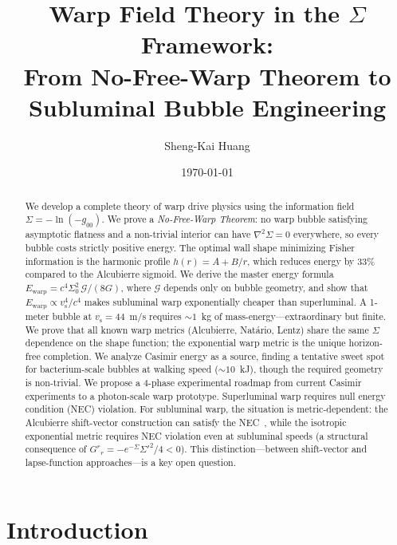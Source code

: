\documentclass[prd,twocolumn,superscriptaddress,longbibliography]{revtex4-2}
\newcommand{\vs}{v_{\mathrm{s}}}
\newcommand{\Ewarp}{E_{\mathrm{warp}}}
\newcommand{\Ggeom}{\mathcal{G}}
\begin{document}
\title{Warp Field Theory in the $\Sigma$ Framework:\\
From No-Free-Warp Theorem to Subluminal Bubble Engineering}

\author{Sheng-Kai Huang}

\date{\today}

\begin{abstract}
We develop a complete theory of warp drive physics using the
information field $\Sigma = -\ln(-g_{00})$.  We prove a
\emph{No-Free-Warp Theorem}: no warp bubble satisfying asymptotic
flatness and a non-trivial interior can have $\nabla^2\Sigma = 0$
everywhere, so every bubble costs strictly positive energy.  The
optimal wall shape minimizing Fisher information is the harmonic
profile $h(r) = A + B/r$, which reduces energy by 33\% compared
to the Alcubierre sigmoid.  We derive the master energy formula
$\Ewarp = c^4\Sigma_0^2\,\Ggeom/(8G)$, where $\Ggeom$ depends
only on bubble geometry, and show that
$\Ewarp \propto \vs^4/c^4$ makes subluminal warp exponentially
cheaper than superluminal.  A 1-meter bubble at $\vs = 44$~m/s
requires $\sim\!1$~kg of mass-energy---extraordinary but finite.
We prove that all known warp metrics (Alcubierre, Nat\'{a}rio,
Lentz) share the same $\Sigma$ dependence on the shape function;
the exponential warp metric is the unique horizon-free completion.
We analyze Casimir energy as a source, finding a tentative sweet
spot for bacterium-scale bubbles at walking speed ($\sim\!10$~kJ),
though the required geometry is non-trivial.  We propose a
4-phase experimental roadmap from current Casimir experiments to
a photon-scale warp prototype.  Superluminal warp requires
null energy condition (NEC) violation.  For subluminal warp, the
situation is metric-dependent: the Alcubierre shift-vector
construction can satisfy the NEC~\cite{Fuchs2024}, while the
isotropic exponential metric requires NEC violation even at
subluminal speeds (a structural consequence of
$G^r{}_r = -e^{-\Sigma}\Sigma'^2/4 < 0$).
This distinction---between shift-vector and lapse-function
approaches---is a key open question.
\end{abstract}

\maketitle

\section{Introduction}
\label{sec:intro}
\end{document}
